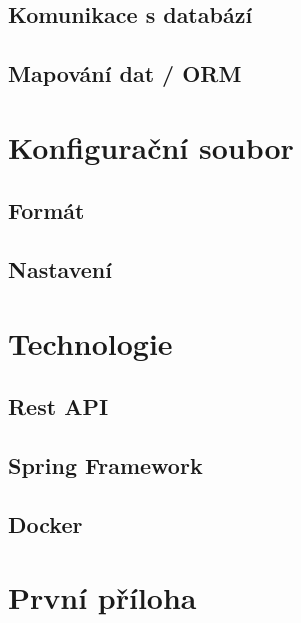 \documentclass[czech, kiv, ba, he, iso690alph, pdf]{fasthesis}
\begin{document}
\section{Komunikace s databází}
\section{Mapování dat / ORM}

\chapter{Konfigurační soubor}
\section{Formát}
\section{Nastavení}

\chapter{Technologie}
\section{Rest API}
\section{Spring Framework}
\section{Docker}




\appendix
\chapter{První příloha}
\backmatter
\printbibliography
\setbackpageqrcode
\backpage
\end{document}
